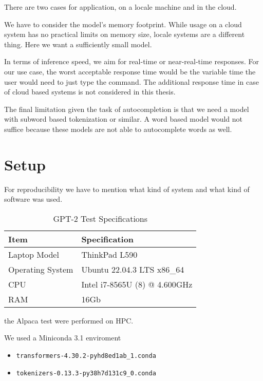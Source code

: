 There are two cases for application, on a locale machine and in the cloud.



We have to consider the model's memory footprint. While usage on a cloud system has no practical limits on memory size, locale systems are a different thing.
Here we want a sufficiently small model.

In terms of inference speed, we aim for real-time or near-real-time responses. For our       use case, the worst acceptable response time would be the variable time the user would need to just type the command. The additional response time in case of cloud based systems is not considered in this thesis.

The final limitation given the task of autocompletion is that we need a model with subword based tokenization or similar. A word based model would not suffice because these models are not able to autocomplete words as well.


\section{Setup}\raggedbottom
For reproducibility we have to mention what kind of system and what kind of software was used.

\begin{table}[h]
\centering
\begin{tabular}{|l|l|}
\hline
\textbf{Item} & \textbf{Specification} \\
\hline
Laptop Model & ThinkPad L590 \\
\hline
Operating System & Ubuntu 22.04.3 LTS x86\_64 \\
\hline
CPU & Intel i7-8565U (8) @ 4.600GHz \\
\hline
RAM & 16Gb \\
\hline
\end{tabular}
\caption{GPT-2 Test Specifications }
\end{table}

the Alpaca test were performed on HPC.


We used a Miniconda 3.1 enviroment

\begin{itemize}
\item \begin{verbatim}
transformers-4.30.2-pyhd8ed1ab_1.conda
\end{verbatim}

\item \begin{verbatim}
tokenizers-0.13.3-py38h7d131c9_0.conda
\end{verbatim}
  
\end{itemize}

